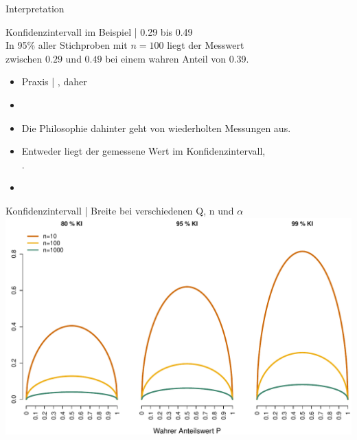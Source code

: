 \begin{frame}
  {Interpretation}
  \begin{center}
    Konfidenzintervall im Beispiel | \alert{0.29 bis 0.49}\\
    \Halbzeile
    In 95\% aller Stichproben mit $n=100$ liegt der Messwert\\
    zwischen $0.29$ und $0.49$ bei einem wahren Anteil von 0.39.
  \end{center}
  \Zeile
  \begin{itemize}[<+->]
    \item Praxis | , daher 
    \Zeile
    \item {}
    \item Die Philosophie dahinter geht von \alert{wiederholten Messungen} aus.
      \Halbzeile
    \item Entweder liegt der gemessene Wert im Konfidenzintervall,\\
      .
      \Halbzeile
    \item {}
  \end{itemize}
\end{frame}

\begin{frame}
  {Konfidenzintervall | Breite bei verschiedenen Q, n und $\alpha$}
  \centering 
  \includegraphics[height=0.85\textheight]{RVorlesung/threecis}
\end{frame}

